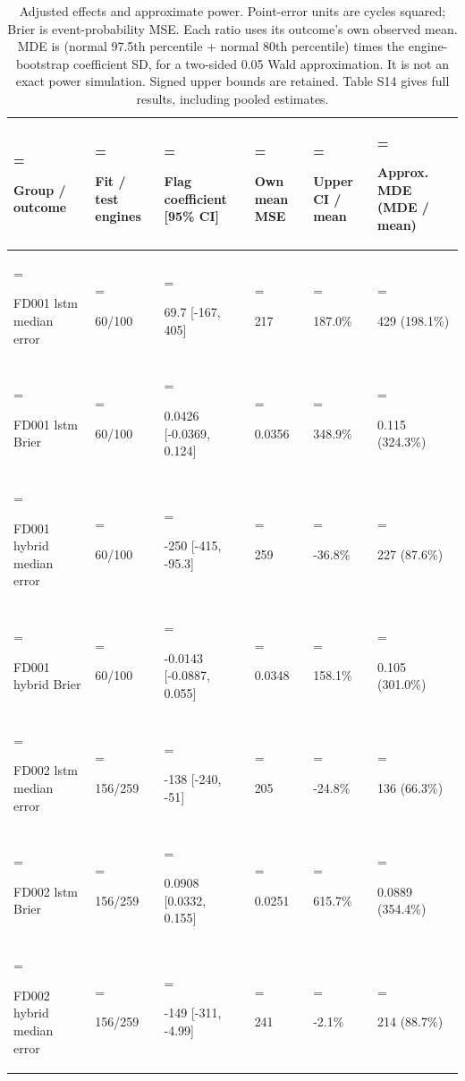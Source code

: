 \documentclass[IJPHM, 2026, 0]{phmsociety}
\begin{document}
\begin{table}[t]
\centering
\normalsize
\setlength{\tabcolsep}{3pt}
\renewcommand{\arraystretch}{1.12}
\setcounter{table}{0}
\caption{Adjusted effects and approximate power. Point-error units are cycles squared; Brier is event-probability MSE. Each ratio uses its outcome's own observed mean. MDE is (normal 97.5th percentile + normal 80th percentile) times the engine-bootstrap coefficient SD, for a two-sided \mbox{0.05} Wald approximation. It is not an exact power simulation. Signed upper bounds are retained. Table S14 gives full results, including pooled estimates.}
\label{tab:1}
\begin{tabularx}{\textwidth}{@{}>{\hsize=1.171875\hsize\linewidth=\hsize\raggedright\arraybackslash}X>{\hsize=0.750000\hsize\linewidth=\hsize\raggedright\arraybackslash}X>{\hsize=1.546875\hsize\linewidth=\hsize\raggedright\arraybackslash}X>{\hsize=0.750000\hsize\linewidth=\hsize\raggedright\arraybackslash}X>{\hsize=0.750000\hsize\linewidth=\hsize\raggedright\arraybackslash}X>{\hsize=1.031250\hsize\linewidth=\hsize\raggedright\arraybackslash}X@{}}
\toprule
Group / outcome & Fit / test engines & Flag coefficient {[}\mbox{95}\% CI{]} & Own mean MSE & Upper CI / mean & Approx. MDE (MDE / mean) \\
\midrule
FD001 lstm median error & \mbox{60}/\mbox{100} & \mbox{69.7} {[}\mbox{-167}, \mbox{405}{]} & \mbox{217} & \mbox{187.0}\% & \mbox{429} (\mbox{198.1}\%) \\
FD001 lstm Brier & \mbox{60}/\mbox{100} & \mbox{0.0426} {[}\mbox{-0.0369}, \mbox{0.124}{]} & \mbox{0.0356} & \mbox{348.9}\% & \mbox{0.115} (\mbox{324.3}\%) \\
FD001 hybrid median error & \mbox{60}/\mbox{100} & \mbox{-250} {[}\mbox{-415}, \mbox{-95.3}{]} & \mbox{259} & \mbox{-36.8}\% & \mbox{227} (\mbox{87.6}\%) \\
FD001 hybrid Brier & \mbox{60}/\mbox{100} & \mbox{-0.0143} {[}\mbox{-0.0887}, \mbox{0.055}{]} & \mbox{0.0348} & \mbox{158.1}\% & \mbox{0.105} (\mbox{301.0}\%) \\
FD002 lstm median error & \mbox{156}/\mbox{259} & \mbox{-138} {[}\mbox{-240}, \mbox{-51}{]} & \mbox{205} & \mbox{-24.8}\% & \mbox{136} (\mbox{66.3}\%) \\
FD002 lstm Brier & \mbox{156}/\mbox{259} & \mbox{0.0908} {[}\mbox{0.0332}, \mbox{0.155}{]} & \mbox{0.0251} & \mbox{615.7}\% & \mbox{0.0889} (\mbox{354.4}\%) \\
FD002 hybrid median error & \mbox{156}/\mbox{259} & \mbox{-149} {[}\mbox{-311}, \mbox{-4.99}{]} & \mbox{241} & \mbox{-2.1}\% & \mbox{214} (\mbox{88.7}\%) \\

\end{tabularx}
\end{table}
\end{document}
